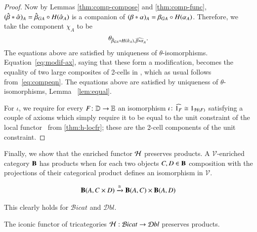 \documentclass{amsart}
\begin{document}
\begin{proof}
  Now by Lemmas \ref{thm:comp-compose} and
  \ref{thm:comp-func}, $(\hat{\beta} *\hat{\alpha})_A = \hat{\beta}_{GA} \circ
  H(\hat{\alpha}_A)$ is a companion of $(\beta*\alpha)_A = \beta_{GA} \circ
  H(\alpha_A)$.  Therefore, we take the component $\chi_A$ to be
  \[\theta_{\hat{\beta}_{GA} \circ H(\hat{\alpha}_A),\, \widehat{\beta*\alpha}_A}.\]
  The equations above are satisfied by uniqueness of $\theta$-isomorphisms.
   Equation~\eqref{eq:modif-ax}, saying that these form a modification,
  becomes the equality of two large composites of 2-cells in \lD,
  which as usual follows from~\eqref{eq:compeqn}. The equations above are satisfied by uniqueness of $\theta$-isomorphisms, Lemma ~\ref{lem:equal}.

  For $\iota$, we require for every $F\colon \mathbb{D}\to\mathbb{E}$ an isomorphism  $\iota\colon \widehat{1_F} \cong 1_{\mathcal{H}(F)}$ satisfying a couple of
  axioms which simply require it to be equal to the unit constraint of
  the local functor \cH\ from \autoref{thm:h-locfr}; these are the
  2-cell components of the unit constraint.  %
\end{proof}

Finally, we show that the enriched functor $\mathcal{H}$ preserves products. A $\mathcal{V}$-enriched category ${\bf B}$ has products when for each two objects $C,D \in {\bf B}$ composition with the projections of their categorical product defines an isomorphism in $\mathcal{V}$.

\begin{align}
{\bf B}(A, C \times D) \xrightarrow{\cong} {\bf B}(A,C) \times {\bf B}(A,D)
\end{align}

This clearly holds for $\mathcal{B}icat$ and $\mathcal{D}bl$. 

\begin{thm}
The iconic functor of tricategories $\mathcal{H}: \mathcal{B}icat \rightarrow \mathcal{D}bl$ preserves products.
\end{thm}
\end{document}
